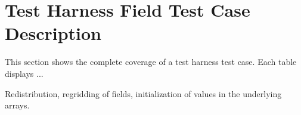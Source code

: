\section{Test Harness Field Test Case Description}
This section shows the complete coverage of a test harness test case. Each table displays ...

Redistribution, regridding of fields, initialization of values in the underlying arrays.

